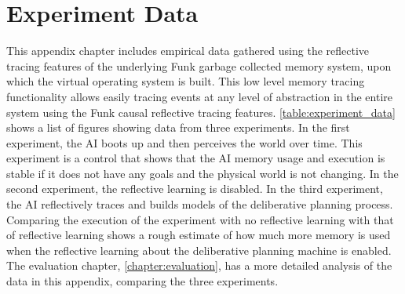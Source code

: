 \chapter{Experiment Data}
\label{chapter:experiment_data}

This appendix chapter includes empirical data gathered using the
reflective tracing features of the underlying Funk garbage collected
memory system, upon which the virtual operating system is built.  This
low level memory tracing functionality allows easily tracing events at
any level of abstraction in the entire system using the Funk causal
reflective tracing features.  \autoref{table:experiment_data} shows a
list of figures showing data from three experiments.  In the first
experiment, the AI boots up and then perceives the world over time.
This experiment is a control that shows that the AI memory usage and
execution is stable if it does not have any goals and the physical
world is not changing.  In the second experiment, the reflective
learning is disabled.  In the third experiment, the AI reflectively
traces and builds models of the deliberative planning process.
Comparing the execution of the experiment with no reflective learning
with that of reflective learning shows a rough estimate of how much
more memory is used when the reflective learning about the
deliberative planning machine is enabled.  The evaluation chapter,
\autoref{chapter:evaluation}, has a more detailed analysis of the data
in this appendix, comparing the three experiments.




